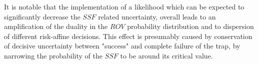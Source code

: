 		It is notable that the implementation of a likelihood which can be expected to significantly decrease the $SSF$ related uncertainty, overall leads to an amplification of the duality in the $ROV$ probability distribution and to dispersion of different risk-affine decisions. This effect is presumably caused by conservation of decisive uncertainty between "success" and complete failure of the trap, by narrowing the probability of the $SSF$ to be around its critical value. 